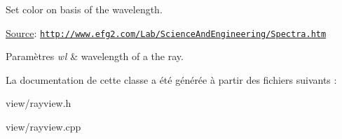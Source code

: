 Set color on basis of the wavelength. 

\hyperlink{classSource}{Source}\+: \href{http://www.efg2.com/Lab/ScienceAndEngineering/Spectra.htm}{\tt http\+://www.\+efg2.\+com/\+Lab/\+Science\+And\+Engineering/\+Spectra.\+htm} 
\begin{DoxyParams}{Paramètres}
{\em wl} & wavelength of a the ray. \\
\hline
\end{DoxyParams}


La documentation de cette classe a été générée à partir des fichiers suivants \+:\begin{DoxyCompactItemize}
\item 
view/rayview.\+h\item 
view/rayview.\+cpp\end{DoxyCompactItemize}
